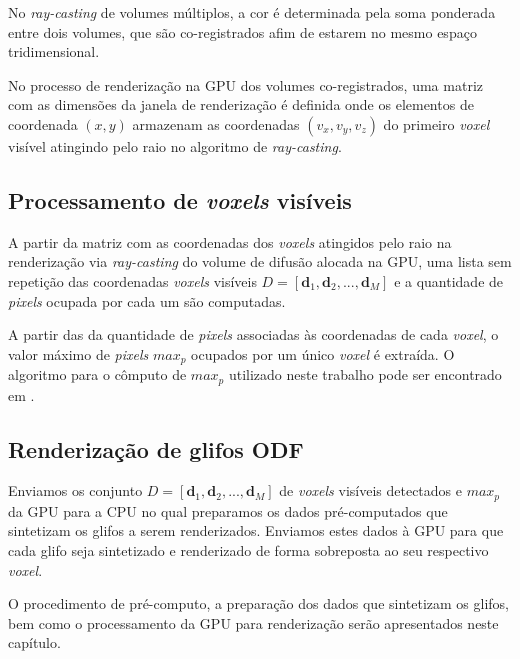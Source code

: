 No \textit{ray-casting} de volumes múltiplos, a cor é determinada pela soma ponderada entre dois volumes, que são co-registrados afim de estarem no mesmo espaço tridimensional.

No processo de renderização na GPU dos volumes co-registrados, uma matriz com as dimensões da janela de renderização é definida onde os elementos de coordenada  $(x, y)$ armazenam as coordenadas $(v_x, v_y, v_z)$ do primeiro \textit{voxel} visível atingindo pelo raio no algoritmo de \textit{ray-casting}.

\subsection{Processamento de \textit{voxels} visíveis}

A partir da matriz com as coordenadas dos \textit{voxels} atingidos pelo raio na renderização via \textit{ray-casting} do volume de difusão alocada na GPU, uma lista sem repetição das coordenadas \textit{voxels} visíveis $D = [
\mathbf{d}_1,
\mathbf{d}_2, ..., 
\mathbf{d}_M
]$ e a quantidade de \textit{pixels} ocupada por cada um são computadas.

A partir das da quantidade de \textit{pixels} associadas às coordenadas de cada \textit{voxel}, o valor máximo de \textit{pixels} $max_p$ ocupados por um único \textit{voxel} é extraída. O algoritmo para o cômputo de $max_p$ utilizado neste trabalho pode ser encontrado em .

\subsection{Renderização de glifos ODF}

Enviamos os conjunto $D = [
\mathbf{d}_1,
\mathbf{d}_2, ..., 
\mathbf{d}_M
]$ de \textit{voxels} visíveis detectados e $max_p$ da GPU para a CPU no qual preparamos os dados pré-computados que sintetizam os glifos a serem renderizados. Enviamos estes dados à GPU para que cada glifo seja sintetizado e renderizado de forma sobreposta ao seu respectivo \textit{voxel}.

O procedimento de pré-computo, a preparação dos dados que sintetizam os glifos, bem como o processamento da GPU para renderização serão apresentados neste capítulo.






